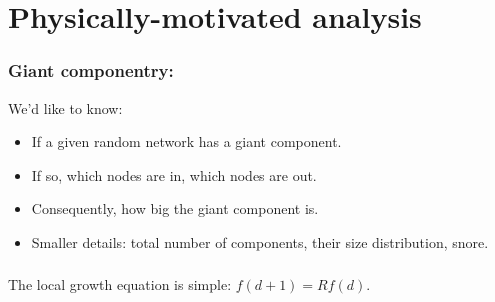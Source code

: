 \section{Physically-motivated analysis}

\begin{frame}
  \frametitle{Giant componentry:}

  \begin{block}{We'd like to know:}
    
  \begin{itemize}
  \item<1->
    If a given random network has a giant component.
  \item<2->
    If so, which nodes are in, which nodes are out.
  \item<3->
    Consequently, how big the giant component is.
  \item<4->
    Smaller details: total number of components,
    their size distribution, snore.
  \end{itemize}
  \end{block}


\end{frame}

\begin{frame}
  \frametitle{}

  The local growth equation is simple: $f(d+1) = R f(d)$.

\end{frame}

\begin{frame}
  \frametitle{}

\end{frame}

\begin{frame}
  \frametitle{}

\end{frame}

\begin{frame}
  \frametitle{}

\end{frame}

\begin{frame}
  \frametitle{}

\end{frame}

